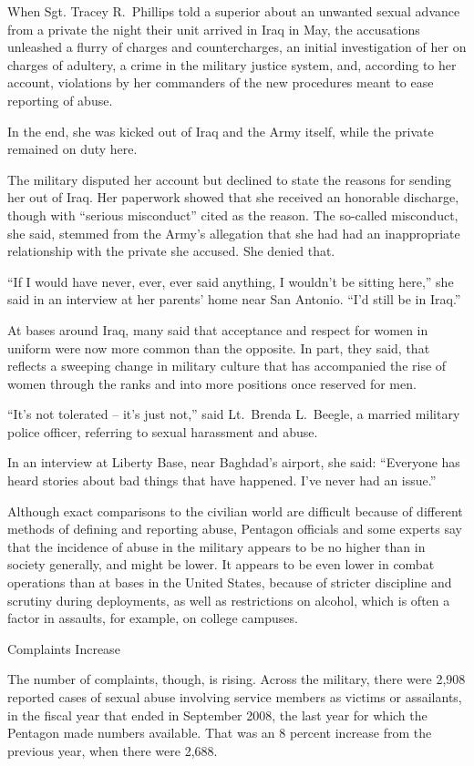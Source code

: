 ﻿\documentclass[12pt]{article}
\begin{document}
When Sgt. Tracey R.~Phillips told a superior about an unwanted sexual advance from a private the
night their unit arrived in Iraq in May, the accusations unleashed a flurry of charges and
countercharges, an initial investigation of her on charges of adultery, a crime in the military
justice system, and, according to her account, violations by her commanders of the new procedures
meant to ease reporting of abuse.

In the end, she was kicked out of Iraq and the Army itself, while the private remained on duty here.

The military disputed her account but declined to state the reasons for sending her out of Iraq. Her
paperwork showed that she received an honorable discharge, though with ``serious misconduct'' cited
as the reason. The so-called misconduct, she said, stemmed from the Army's allegation that she had
had an inappropriate relationship with the private she accused. She denied that.

``If I would have never, ever, ever said anything, I wouldn't be sitting here,'' she said in an
interview at her parents' home near San Antonio. ``I'd still be in Iraq.''

At bases around Iraq, many said that acceptance and respect for women in uniform were now more
common than the opposite. In part, they said, that reflects a sweeping change in military culture
that has accompanied the rise of women through the ranks and into more positions once reserved for
men.

``It's not tolerated -- it's just not,'' said Lt.~Brenda L.~Beegle, a married military police
officer, referring to sexual harassment and abuse.

In an interview at Liberty Base, near Baghdad's airport, she said: ``Everyone has heard stories
about bad things that have happened. I've never had an issue.''

Although exact comparisons to the civilian world are difficult because of different methods of
defining and reporting abuse, Pentagon officials and some experts say that the incidence of abuse in
the military appears to be no higher than in society generally, and might be lower. It appears to be
even lower in combat operations than at bases in the United States, because of stricter discipline
and scrutiny during deployments, as well as restrictions on alcohol, which is often a factor in
assaults, for example, on college campuses.

Complaints Increase

The number of complaints, though, is rising. Across the military, there were 2,908 reported cases of
sexual abuse involving service members as victims or assailants, in the fiscal year that ended in
September 2008, the last year for which the Pentagon made numbers available. That was an 8 percent
increase from the previous year, when there were 2,688.
\end{document}
